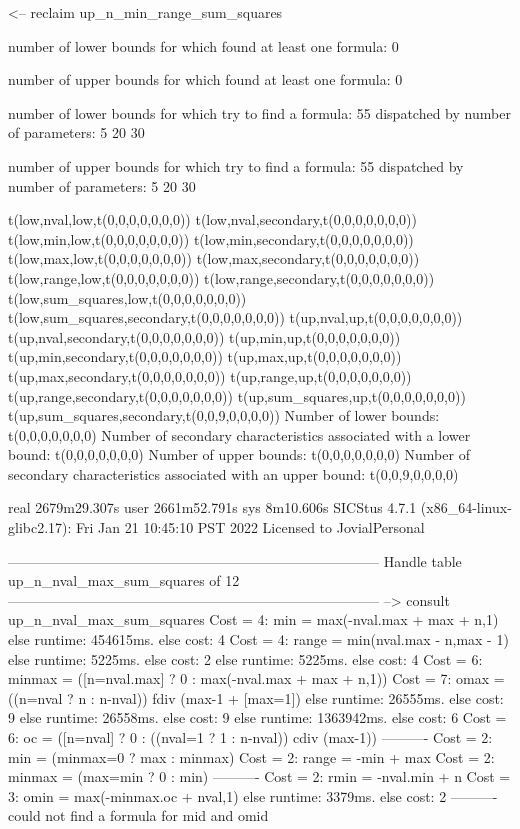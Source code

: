 <-- reclaim up_n_min_range_sum_squares

number of lower bounds for which found at least one formula: 0

number of upper bounds for which found at least one formula: 0

number of lower bounds for which try to find a formula: 55
dispatched by number of parameters: 5  20  30

number of upper bounds for which try to find a formula: 55
dispatched by number of parameters: 5  20  30

t(low,nval,low,t(0,0,0,0,0,0,0))
t(low,nval,secondary,t(0,0,0,0,0,0,0))
t(low,min,low,t(0,0,0,0,0,0,0))
t(low,min,secondary,t(0,0,0,0,0,0,0))
t(low,max,low,t(0,0,0,0,0,0,0))
t(low,max,secondary,t(0,0,0,0,0,0,0))
t(low,range,low,t(0,0,0,0,0,0,0))
t(low,range,secondary,t(0,0,0,0,0,0,0))
t(low,sum_squares,low,t(0,0,0,0,0,0,0))
t(low,sum_squares,secondary,t(0,0,0,0,0,0,0))
t(up,nval,up,t(0,0,0,0,0,0,0))
t(up,nval,secondary,t(0,0,0,0,0,0,0))
t(up,min,up,t(0,0,0,0,0,0,0))
t(up,min,secondary,t(0,0,0,0,0,0,0))
t(up,max,up,t(0,0,0,0,0,0,0))
t(up,max,secondary,t(0,0,0,0,0,0,0))
t(up,range,up,t(0,0,0,0,0,0,0))
t(up,range,secondary,t(0,0,0,0,0,0,0))
t(up,sum_squares,up,t(0,0,0,0,0,0,0))
t(up,sum_squares,secondary,t(0,0,9,0,0,0,0))
Number of lower bounds:                                             t(0,0,0,0,0,0,0)
Number of secondary characteristics associated with a lower bound:  t(0,0,0,0,0,0,0)
Number of upper bounds:                                             t(0,0,0,0,0,0,0)
Number of secondary characteristics associated with an upper bound: t(0,0,9,0,0,0,0)

real	2679m29.307s
user	2661m52.791s
sys	8m10.606s
SICStus 4.7.1 (x86_64-linux-glibc2.17): Fri Jan 21 10:45:10 PST 2022
Licensed to JovialPersonal


--------------------------------------------------------------------------------
Handle table up_n_nval_max_sum_squares of 12
--------------------------------------------------------------------------------
--> consult up_n_nval_max_sum_squares
Cost =  4:  min    = max(-nval.max + max + n,1)
else runtime: 454615ms. else cost: 4
Cost =  4:  range  = min(nval.max - n,max - 1) %
else runtime: 5225ms. else cost: 2
else runtime: 5225ms. else cost: 4
Cost =  6:  minmax = ([n=nval.max] ? 0 : max(-nval.max + max + n,1)) %
Cost =  7:  omax   = ((n=nval ? n : n-nval)) fdiv (max-1 + [max=1]) %
else runtime: 26555ms. else cost: 9
else runtime: 26558ms. else cost: 9
else runtime: 1363942ms. else cost: 6
Cost =  6:  oc     = ([n=nval] ? 0 : ((nval=1 ? 1 : n-nval)) cdiv (max-1)) %
----------
Cost =  2:  min    = (minmax=0 ? max : minmax)
Cost =  2:  range  = -min + max
Cost =  2:  minmax = (max=min ? 0 : min)
----------
Cost =  2:  rmin   = -nval.min + n
Cost =  3:  omin   = max(-minmax.oc + nval,1)
else runtime: 3379ms. else cost: 2
----------
could not find a formula for mid and omid

